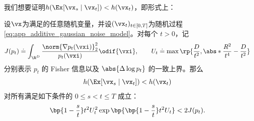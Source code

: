 \documentclass[../../book-main_zh.tex]{subfiles}
\begin{document}
我们想要证明\(h(\Ex[\vx_{s} \mid \vx_{t}]) < h(\vx_{t})\)，即形式上：
\begin{theorem}\label{thm:conditioning_reduces_entropy}
    设\(\vx\)为满足的任意随机变量，并设\((\vx_{t})_{t \in [0, T]}\)为随机过程\eqref{eq:app_additive_gaussian_noise_model}。对每个 \(t > 0\)，记
    \begin{equation}
        J(p_{t}) \doteq
        \int_{\R^{D}}\frac{\norm{\nabla
        p_{t}(\vxi)}_{2}^{2}}{p_{t}(\vxi)}\odif{\vxi}, \qquad
        U_{t} \doteq \max\rp{\frac{D}{t^{2}},
        \abs*{\frac{R^{2}}{t^{4}} - \frac{D}{t^{2}}}
        }
    \end{equation}
    分别表示 \(p_t\) 的 Fisher 信息以及 \(\abs{\Delta \log p_t}\) 的一致上界。那么
    \begin{equation}
        h(\Ex[\vx_{s} \mid \vx_{t}]) < h(\vx_{t})
    \end{equation}
    对所有满足如下条件的 \(0 \leq s < t \leq T\) 成立：
    \begin{equation}\label{eq:conditioning_entropy_condition}
        \bp{1 - \frac{s}{t}}t^{2}U_{t}^{2}
        \exp\bp{\bp{1 - \frac{s}{t}}t^{2}U_{t}} < 2J(p_{t}).
    \end{equation}
\end{theorem}
\end{document}
